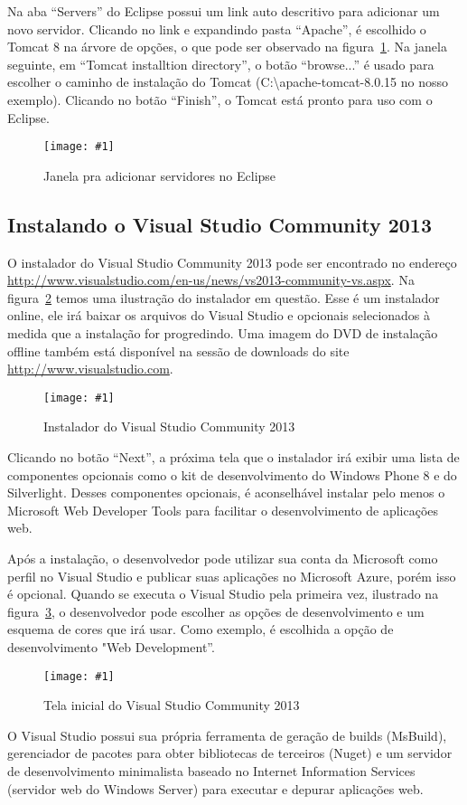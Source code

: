 \documentclass[a4paper,12pt]{article}
\newcommand{\figura}[3] {
	\begin{figure}[H]
		\centering
		\texttt{[image: \#1]}
		\caption{#2}
		\label{#3}
	\end{figure}
	\FloatBarrier
}
\begin{document}
Na aba “Servers” do Eclipse possui um link auto descritivo para adicionar um novo servidor. Clicando no link e expandindo pasta “Apache”, é escolhido o Tomcat 8 na árvore de opções, o que pode ser observado na figura~\ref{fig:tomcat1}. Na janela seguinte, em “Tomcat installtion directory”, o botão “browse...” é usado para escolher o caminho de instalação do Tomcat (C:\textbackslash apache-tomcat-\textmd{8.0.15} no nosso exemplo). Clicando no botão “Finish”, o Tomcat está pronto para uso com o Eclipse. 

\figura{tomcat1.png}{Janela pra adicionar servidores no Eclipse}{fig:tomcat1}

\subsection{Instalando o Visual Studio Community 2013} 

O instalador do Visual Studio Community 2013 pode ser encontrado no endereço \url{http://www.visualstudio.com/en-us/news/vs2013-community-vs.aspx}. Na figura~\ref{fig:vs1} temos uma ilustração do instalador em questão. Esse é um instalador online, ele irá baixar os arquivos do Visual Studio e opcionais selecionados à medida que a instalação for progredindo. Uma imagem do DVD de instalação offline também está disponível na sessão de downloads do site \url{http://www.visualstudio.com}.

\figura{vs1.png}{Instalador do Visual Studio Community 2013}{fig:vs1}

Clicando no botão “Next”, a próxima tela que o instalador irá exibir uma lista de componentes opcionais como o kit de desenvolvimento do Windows Phone 8 e do Silverlight. Desses componentes opcionais, é aconselhável instalar pelo menos o Microsoft Web Developer Tools para facilitar o desenvolvimento de aplicações web.

Após a instalação, o desenvolvedor pode utilizar sua conta da Microsoft como perfil no Visual Studio e publicar suas aplicações no Microsoft Azure, porém isso é opcional. Quando se executa o Visual Studio pela primeira vez, ilustrado na figura~\ref{fig:vs2}, o desenvolvedor pode escolher as opções de desenvolvimento e um esquema de cores que irá usar. Como exemplo, é escolhida a opção de desenvolvimento "Web Development”.

\figura{vs2.png}{Tela inicial do Visual Studio Community 2013}{fig:vs2}

O Visual Studio possui sua própria ferramenta de geração de builds (MsBuild), gerenciador de pacotes para obter bibliotecas de terceiros (Nuget) e um servidor de desenvolvimento minimalista baseado no Internet Information Services (servidor web do Windows Server) para executar e depurar aplicações web.  
\end{document}

